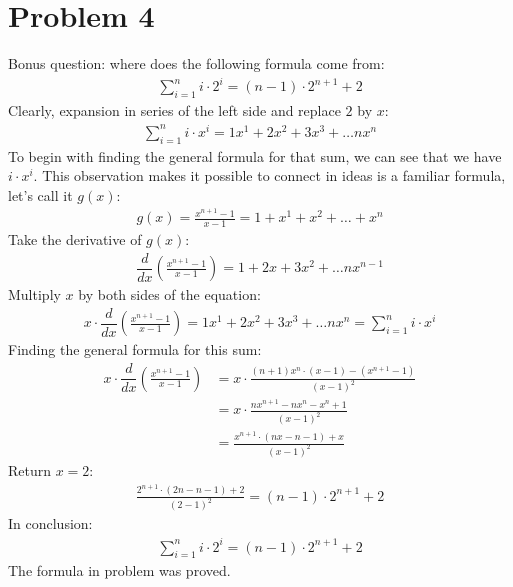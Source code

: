 \documentclass[a4paper]{article}
\begin{document}
\section{Problem 4}
Bonus question: where does the following formula come from:
\begin{gather*}
    \sum_{i=1}^{n}{i \cdot 2^i} = (n-1) \cdot 2^{n+1} + 2
\end{gather*}
Clearly, expansion in series of the left side and replace $2$ by $x$: 
\begin{gather*}
     \sum_{i=1}^{n}{i \cdot x^i} = 1x^1 + 2x^2 + 3x^3 + \ldots nx^{n}
\end{gather*}
To begin with finding the general formula for that sum, we can see that we have $i \cdot x^i$. This observation makes it possible to connect in ideas is a familiar formula, let's call it $g(x)$:
\begin{gather*}
    g(x) = \frac{x^{n+1}-1}{x-1} = 1 + x^1+x^2+ \ldots + x^n
\end{gather*}
Take the derivative of $g(x)$: 
\begin{gather*}
    \dfrac{d}{dx}(\frac{x^{n+1}-1}{x-1})= 1 + 2x + 3x^2 + \ldots nx^{n-1}
\end{gather*}
Multiply $x$ by both sides of the equation: 
\begin{gather*}
    x \cdot \dfrac{d}{dx}(\frac{x^{n+1}-1}{x-1}) = 1x^1 + 2x^2 + 3x^3 + \ldots nx^{n} = \sum_{i=1}^{n}{i \cdot x^i}
\end{gather*}
Finding the general formula for this sum: 
\begin{equation*}
\begin{aligned}
    x \cdot \dfrac{d}{dx}(\frac{x^{n+1}-1}{x-1})& = x \cdot \frac{(n+1)x^n \cdot (x-1) - (x^{n+1}-1)}{(x-1)^2}  \\ 
    & = x \cdot \frac{nx^{n+1} - nx^n - x^n + 1}{(x-1)^2} \\
    & = \frac{x^{n+1} \cdot(nx -n-1) + x}{(x-1)^2}
\end{aligned}
\end{equation*}
Return $x=2$:
\begin{gather*}
    \frac{2^{n+1} \cdot(2n -n-1) + 2}{(2-1)^2} = (n-1) \cdot 2^{n+1} + 2
\end{gather*}
In conclusion: 
\begin{gather*}
     \sum_{i=1}^{n}{i \cdot 2^i} = (n-1) \cdot 2^{n+1} + 2
\end{gather*}
The formula in problem was proved.

\newpage
\end{document}
